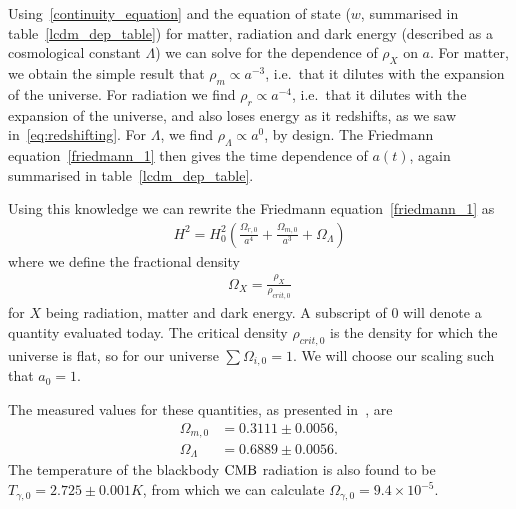     Using~\eqref{continuity_equation} and the equation of state ($w$, summarised in table~\ref{lcdm_dep_table})
    for matter, radiation and dark energy (described as a cosmological constant $\Lambda$)
    we can solve for the dependence of $\rho_X$ on $a$.
    For matter, we obtain the simple result that $\rho_m\propto a^{-3}$,
    i.e.\ that it dilutes with the expansion of the universe.
    For radiation we find $\rho_r\propto a^{-4}$,
    i.e.\ that it dilutes with the expansion of the universe,
    and also loses energy as it redshifts, as we
    saw in~\eqref{eq:redshifting}.
    For $\Lambda$, we find $\rho_\Lambda\propto a^0$, by design.
    The Friedmann equation~\eqref{friedmann_1} then gives the time dependence of
    $a(t)$, again summarised in table~\ref{lcdm_dep_table}.


    Using this knowledge we can
    rewrite the Friedmann equation~\eqref{friedmann_1} as
    \begin{align}\label{friedmann_omega}
        H^2 = H_0^2\left(\frac{\Omega_{r,0}}{a^4}+\frac{\Omega_{m,0}}{a^3}+\Omega_{\Lambda}\right)
    \end{align}
    where we define the fractional density
    \begin{align}
        \Omega_{X} = \frac{\rho_X}{\rho_{crit,0}}
    \end{align}
    for $X$ being radiation, matter and dark energy.
    A subscript of $0$ will denote a quantity evaluated today.
    The critical density $\rho_{crit,0}$ is the density for which the universe is flat,
    so for our universe $\sum\Omega_{i,0}=1$.
    We will choose our scaling such that $a_0=1$.


    The measured values for these quantities, as presented in~\cite{Planck_parameters_2018},
    are
    \begin{align}\label{measured_params}
        \Omega_{m,0} &= 0.3111 \pm 0.0056,\\
        \Omega_{\Lambda} &=  0.6889 \pm 0.0056.
    \end{align}
    The temperature of the blackbody $\text{CMB}$ radiation is
    also found to be $T_{\gamma,0}=2.725\pm0.001K$, from which
    we can calculate $\Omega_{\gamma,0}=9.4\times10^{-5}$.


